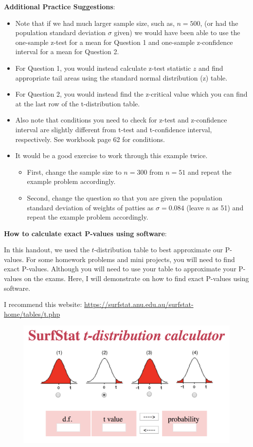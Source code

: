 \documentclass[12pt]{article}
\begin{document}
\textbf{Additional Practice Suggestions}:
\begin{itemize}
	\item Note that if we had much larger sample size, such as, $n = 500$, (or had the population standard deviation $\sigma$ given) we would have been able to use the one-sample z-test for a mean for Question 1 and one-sample z-confidence interval for a mean for Question 2.
	\item For Question 1, you would instead calculate z-test statistic $z$ and find appropriate tail areas using the standard normal distribution (z) table.
	\item For Question 2, you would instead find the z-critical value which you can find at the last row of the t-distribution table.
	\item Also note that conditions you need to check for z-test and z-confidence interval are slightly different from t-test and t-confidence interval, respectively. See workbook page 62 for conditions.
	\item It would be a good exercise to work through this example twice.
	\begin{itemize}
		\item First, change the sample size to $n = 300$ from $n = 51$ and repeat the example problem accordingly.
		\item Second, change the question so that you are given the population standard deviation of weights of patties as $\sigma = 0.084$ (leave $n$ as 51) and repeat the example problem accordingly.
	\end{itemize}
\end{itemize}


\pagebreak

\textbf{How to calculate exact P-values using software}:

In this handout, we used the $t$-distribution table to best approximate our P-values. For some homework problems and mini projects, you will need to find exact P-values. Although you will need to use your table to approximate your P-values on the exams. Here, I will demonstrate on how to find exact P-values using software.

I recommend this website: \url{https://surfstat.anu.edu.au/surfstat-home/tables/t.php}

\begin{figure}[!h]
	\centering
	\vspace{-10 pt}
	\includegraphics[width=12cm]{Figures/fig13.png}
	\vspace{-10 pt}
\end{figure}
\end{document}
